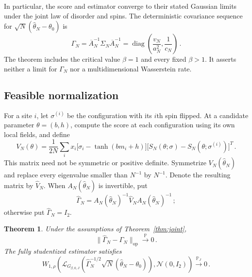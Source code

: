 \documentclass[11pt]{amsart}
\numberwithin{equation}{section}
\newtheorem{theorem}{Theorem}[section]
\theoremstyle{remark}
\newcommand{\Pp}{\mathbb P}
\newcommand{\diag}{\operatorname{diag}}
\newcommand{\op}{\mathrm{op}}
\newcommand{\Law}{\mathcal L}
\newcommand{\Normal}{\mathcal N}
\begin{document}
In particular, the score and estimator converge to their stated Gaussian limits under the joint law of disorder and spins. The deterministic covariance sequence for $\sqrt N(\widehat\theta_N-\theta_0)$ is
\begin{equation}
 \Gamma_N=\overline A_N^{-1}\Sigma_N\overline A_N^{-1}
 =\diag\left(\frac{v_N}{a_N^2},\frac1{c_N}\right)\,.
 \label{eq:estimator-variance}
\end{equation}
The theorem includes the critical value $\beta=1$ and every fixed $\beta>1$. It asserts neither a limit for $\Gamma_N$ nor a multidimensional Wasserstein rate.

\subsection{Feasible normalization}
For a site $i$, let $\sigma^{(i)}$ be the configuration with its $i$th spin flipped. At a candidate parameter $\theta=(b,h)$, compute the score at each configuration using its own local fields, and define
\begin{equation}
 V_N(\theta)=\frac1{2N}\sum_i
 x_i\bigl[\sigma_i-\tanh(bm_i+h)\bigr]
 \bigl[S_N(\theta;\sigma)-S_N(\theta;\sigma^{(i)})\bigr]^T\,.
 \label{eq:feasible-V}
\end{equation}
This matrix need not be symmetric or positive definite. Symmetrize $V_N(\widehat\theta_N)$ and replace every eigenvalue smaller than $N^{-1}$ by $N^{-1}$. Denote the resulting matrix by $\widehat V_N$. When $A_N(\widehat\theta_N)$ is invertible, put
\begin{equation}
 \widehat\Gamma_N
 =A_N(\widehat\theta_N)^{-1}\widehat V_NA_N(\widehat\theta_N)^{-1}\,;
 \label{eq:estimated-covariance}
\end{equation}
otherwise put $\widehat\Gamma_N=I_2$.

\begin{theorem}\label{thm:studentized}
Under the assumptions of Theorem~\ref{thm:joint},
\begin{equation}
 \|\widehat\Gamma_N-\Gamma_N\|_\op\xrightarrow{\Pp}0\,.
 \label{eq:covariance-consistency}
\end{equation}
The fully studentized estimator satisfies
\begin{equation}
 W_{1,\rho}\left(
 \Law_{G_{\beta,0,J}}\left(
 \widehat\Gamma_N^{-1/2}\sqrt N(\widehat\theta_N-\theta_0)\right),
 \Normal(0,I_2)\right)
 \xrightarrow{\Pp_J}0\,.
 \label{eq:studentized-quenched}
\end{equation}
\end{theorem}
\end{document}
